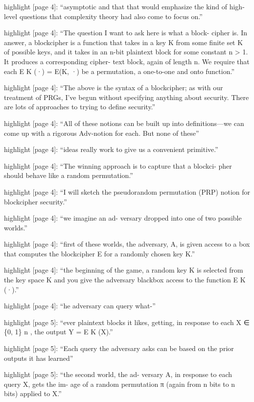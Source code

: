 highlight {[}page 4{]}: ``asymptotic and that that would emphasize the
kind of high-level questions that complexity theory had also come to
focus on.''

highlight {[}page 4{]}: ``The question I want to ask here is what a
block- cipher is. In answer, a blockcipher is a function that takes in a key K from some finite set K of possible keys, and it takes in an n-bit plaintext block for some constant n \textgreater{} 1. It produces a
corresponding cipher- text block, again of length n. We require that
each E K (·) = E(K, ·) be a permutation, a one-to-one and onto
function.''

highlight {[}page 4{]}: ``The above is the syntax of a blockcipher; as
with our treatment of PRGs, I've begun without specifying anything about security. There are lots of approaches to trying to define security.''

highlight {[}page 4{]}: ``All of these notions can be built up into
definitions---we can come up with a rigorous Adv-notion for each. But
none of these''

highlight {[}page 4{]}: ``ideas really work to give us a convenient
primitive.''

highlight {[}page 4{]}: ``The winning approach is to capture that a
blockci- pher should behave like a random permutation.''

highlight {[}page 4{]}: ``I will sketch the pseudorandom permutation
(PRP) notion for blockcipher security.''

highlight {[}page 4{]}: ``we imagine an ad- versary dropped into one of
two possible worlds.''

highlight {[}page 4{]}: ``first of these worlds, the adversary, A, is
given access to a box that computes the blockcipher E for a randomly
chosen key K.''

highlight {[}page 4{]}: ``the beginning of the game, a random key K is
selected from the key space K and you give the adversary blackbox access
to the function E K (·).''

highlight {[}page 4{]}: ``he adversary can query what-''

highlight {[}page 5{]}: ``ever plaintext blocks it likes, getting, in
response to each X ∈ \{0, 1\} n , the output Y = E K (X).''

highlight {[}page 5{]}: ``Each query the adversary asks can be based on
the prior outputs it has learned''

highlight {[}page 5{]}: ``the second world, the ad- versary A, in
response to each query X, gets the im- age of a random permutation π
(again from n bits to n bits) applied to X.''

